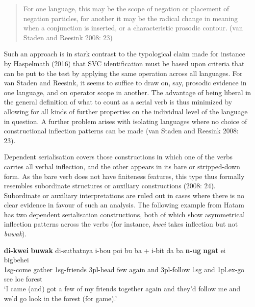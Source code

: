 \begin{quote}For one language, this may be the scope of negation or placement of negation particles, for another it may be the radical change in meaning when a conjunction is inserted, or a characteristic prosodic contour. (van Staden and Reesink 2008: 23)\end{quote}

Such an approach is in stark contrast to the typological claim made for instance by Haspelmath (2016) that SVC identification must be based upon criteria that can be put to the test by applying the same operation across all languages. For van Staden and Reesink, it seems to suffice to draw on, say, prosodic evidence in one language, and on operator scope in another. The advantage of being liberal in the general definition of what to count as a serial verb is thus minimized by allowing for all kinds of further properties on the individual level of the language in question. A further problem arises with isolating languages where no choice of constructional inflection patterns can be made (van Staden and Reesink 2008: 23).

Dependent serialisation covers those constructions in which one of the verbs carries all verbal inflection, and the other appears in its bare or stripped-down form. As the bare verb does not have finiteness features, this type thus formally resembles subordinate structures or auxiliary constructions (2008: 24). Subordinate or auxiliary interpretations are ruled out in cases where there is no clear evidence in favour of such an analysis. The following example from Hatam has two dependent serialisation constructions, both of which show asymmetrical inflection patterns across the verbs (for instance, \textit{kwei} takes inflection but not \textit{buwak}).

\ea \label{}
\gll \textbf{di-kwei} \textbf{buwak} di-sutbatnya i-bou poi bu ba + i-bit da ba \textbf{n-ug} \textbf{ngat} ei bigbehei \\
\acs{1}\acs{sg}-come gather \acs{1}\acs{sg}-friends \acs{3}\acs{pl}-head few again and \acs{3}\acs{pl}-follow \acs{1}\acs{sg} and \acs{1}\acs{pl}.\acs{ex}-go see \acs{loc} forest \\
\glft `I came (and) got a few of my friends together again and they'd follow me and we'd go look in the forest (for game).' \\ 
\z
\xe

